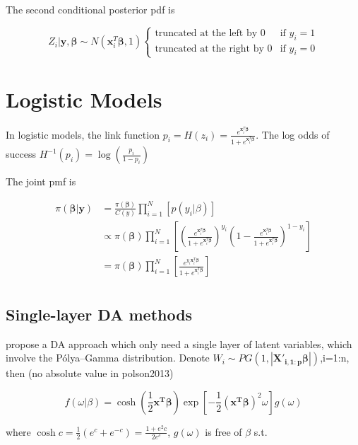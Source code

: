 \documentclass[12pt]{article}
\begin{document}
The second conditional posterior pdf is

\[Z_i|\boldsymbol{y,\beta}\sim N(\mathbf{x}_i^T\boldsymbol{\beta},1)\begin{cases}\text{truncated at the left by 0} & \text{if } y_i=1 \\
 \text{truncated at the right by 0} & \text{if } y_i=0 \end{cases}\]

\hypertarget{logistic-models}{%
\section{Logistic Models}\label{logistic-models}}

In logistic models, the link function
\(p_{i}=H(z_i)= \frac{e^{\mathbf{x}_i^T\boldsymbol{\beta}}}{1+e^{\mathbf{x}_i^T\boldsymbol{\beta}}}\).
The log odds of success \(H^{-1}(p_i)=\log(\frac{p_i}{1-p_i})\)

The joint pmf is

\[\begin{aligned}
\pi(\boldsymbol{\beta|y}) &= \frac{\pi(\boldsymbol{\beta})}{C(y)}\prod_{i=1}^{N}[p(y_i|\beta)]\\
&\propto\pi(\boldsymbol{\beta})\prod_{i=1}^{N}\left[(\frac{e^{\mathbf{x}_i^T\boldsymbol{\beta}}}{1+e^{\mathbf{x}_i^T\boldsymbol{\beta}}})^{y_i}(1-\frac{e^{\mathbf{x}_i^T\boldsymbol{\beta}}}{1+e^{\mathbf{x}_i^T\boldsymbol{\beta}}})^{1-y_i}\right]\\
&=\pi(\boldsymbol{\beta})\prod_{i=1}^{N}\left[\frac{e^{y_i\mathbf{x}_i^T\boldsymbol{\beta}}}{1+e^{\mathbf{x}_i^T\boldsymbol{\beta}}}\right]\\
\end{aligned}\]

\hypertarget{single-layer-da-methods}{%
\subsection{Single-layer DA methods}\label{single-layer-da-methods}}

\citet{polsonBayesianInferenceLogistic2013} propose a DA approach which
only need a single layer of latent variables, which involve the
Pólya--Gamma distribution. Denote
\(W_i \sim PG(1,\boldsymbol{|X'_{i,1:p}\beta|})\),i=1:n, then (no
absolute value in polson2013)

\[f(\omega|\beta)=\cosh{(\frac12\boldsymbol{x^T\beta})}\exp\left[-\frac12(\boldsymbol{x^T\beta})^2\omega\right]g(\omega)\]

where \(\cosh{c}=\frac12(e^c+e^{-c})=\frac{1+e^2c}{2e^{c}}\),
\(g(\omega)\) is free of \(\beta\) s.t.
\end{document}
